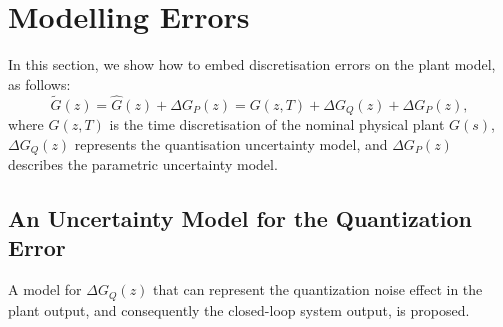 \documentclass{sig-alternate-05-2015}
\newcommand{\red}[1]{{\color{red}#1}}
\begin{document}
\section{Modelling Errors} 

In this section, we show how to embed discretisation errors on the plant model, as follows: 
%
\begin{equation}
\label{eq:uncertainplant}
\tilde G(z) = \hat G(z) + \Delta G_P(z) = G(z,T) + \Delta G_Q(z) + \Delta G_P(z),   
\end{equation}
where $G(z,T)$ is the time discretisation of the nominal physical plant $G(s)$, 
$\Delta{G_{Q}(z)}$ represents the quantisation uncertainty model, 
and $\Delta{G_{P}(z)}$ describes the parametric uncertainty model. 


\subsection{An Uncertainty Model for the Quantization Error} 
\label{sec:uncertainty-model-quantization-error}

%

A model for $\Delta{G_{Q}(z)}$ that can represent the quantization
noise effect in the plant output, and consequently the closed-loop system
output, is proposed.  
\end{document}
